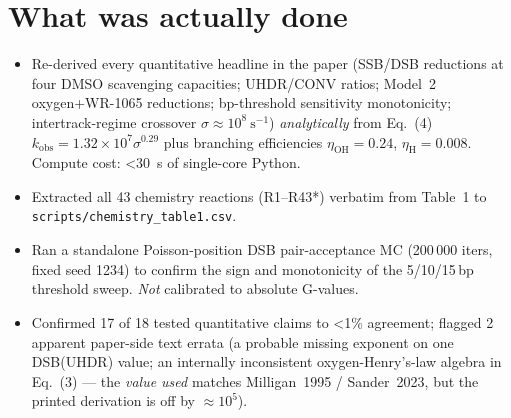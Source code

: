 \documentclass[11pt]{article}
\begin{document}
\section{What was actually done}
\begin{itemize}
  \item Re-derived every quantitative headline in the paper (SSB/DSB reductions
        at four DMSO scavenging capacities; UHDR/CONV ratios; Model~2
        oxygen+WR-1065 reductions; bp-threshold sensitivity monotonicity;
        intertrack-regime crossover $\sigma\!\approx\!10^{8}\ \mathrm{s^{-1}}$)
        \emph{analytically} from Eq.~(4) $k_\mathrm{obs}=1.32\!\times\!10^{7}\sigma^{0.29}$
        plus branching efficiencies $\eta_\mathrm{OH}=0.24$, $\eta_\mathrm{H}=0.008$.
        Compute cost: \textless30~s of single-core Python.
  \item Extracted all 43 chemistry reactions (R1--R43*) verbatim from Table~1 to
        \texttt{scripts/chemistry\_table1.csv}.
  \item Ran a standalone Poisson-position DSB pair-acceptance MC
        (200\,000 iters, fixed seed 1234) to confirm the sign and monotonicity
        of the 5/10/15\,bp threshold sweep. \emph{Not} calibrated to absolute
        G-values.
  \item Confirmed 17 of 18 tested quantitative claims to \textless1\% agreement;
        flagged 2 apparent paper-side text errata (a probable missing exponent
        on one DSB(UHDR) value; an internally inconsistent oxygen-Henry's-law
        algebra in Eq.~(3) --- the \emph{value used} matches Milligan~1995 /
        Sander~2023, but the printed derivation is off by $\approx\!10^{5}$).
\end{itemize}
\end{document}
